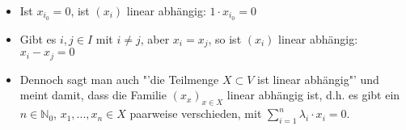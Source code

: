\begin{remark}
	\begin{itemize}
		\item Ist $x_{i_0}=0$, ist $(x_i)$ linear abhängig: $1\cdot x_{i_0}=0$
		\item Gibt es $i,j\in I$ mit $i\neq j$, aber $x_i=x_j$, so ist $(x_i)$ linear abhängig: $x_i-x_j=0$
		\item Dennoch sagt man auch "'die Teilmenge $X\subset V$ ist linear abhängig"' und meint damit, dass die Familie $(x_x)
		_{x\in X}$ linear abhängig ist, d.h. es gibt ein $n\in \mathbb N_0$, $x_1,...,x_n \in X$ paarweise verschieden, mit 
		$\sum_{i=1}^n \lambda_i\cdot x_i=0$.
	\end{itemize}
\end{remark}